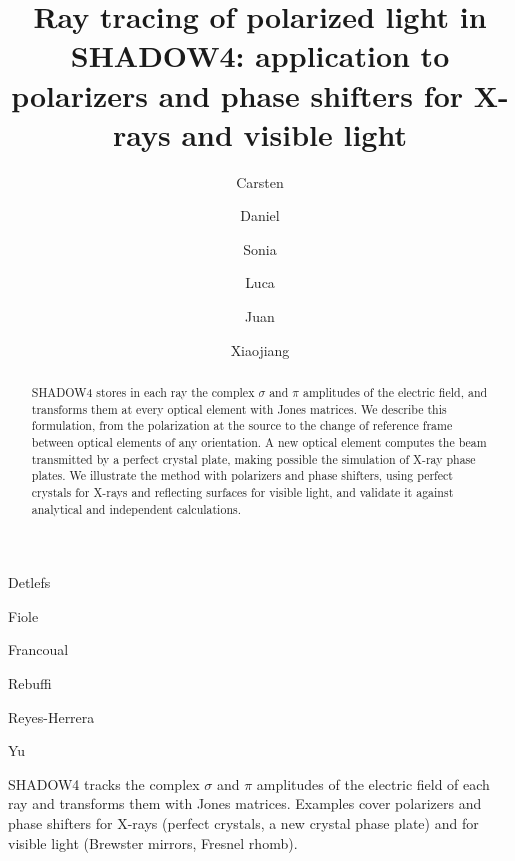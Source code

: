 \documentclass{iucr}
\begin{document}

\title{Ray tracing of polarized light in SHADOW4: application to polarizers and phase shifters for X-rays and visible light}

\author[1]{{Carsten}}{{Detlefs}}
\author[1]{{Daniel}}{{Fiole}}
\author[2]{{Sonia}}{{Francoual}}
\author[3]{{Luca}}{{Rebuffi}}
\author[4]{{Juan}}{{Reyes-Herrera}}
\author[5]{{Xiaojiang}}{{Yu}}



\maketitle   %


\begin{synopsis}
SHADOW4 tracks the complex $\sigma$ and $\pi$ amplitudes of the electric field of each ray and transforms them with Jones matrices. Examples cover polarizers and phase shifters for X-rays (perfect crystals, a new crystal phase plate) and for visible light (Brewster mirrors, Fresnel rhomb).
\end{synopsis}


\begin{abstract}
SHADOW4 stores in each ray the complex $\sigma$ and $\pi$ amplitudes of the electric field, and transforms them at every optical element with Jones matrices. We describe this formulation, from the polarization at the source to the change of reference frame between optical elements of any orientation. A new optical element computes the beam transmitted by a perfect crystal plate, making possible the simulation of X-ray phase plates. We illustrate the method with polarizers and phase shifters, using perfect crystals for X-rays and reflecting surfaces for visible light, and validate it against analytical and independent calculations.
\end{abstract}
\end{document}
